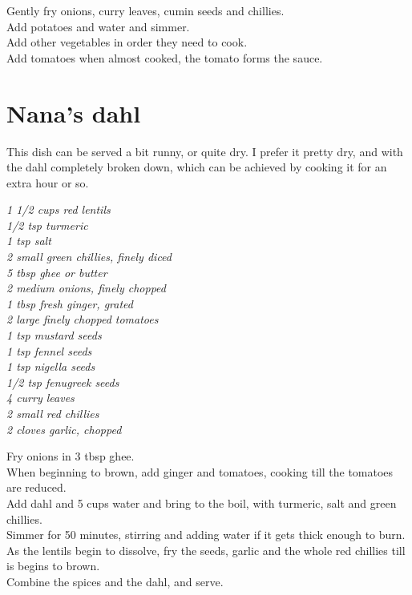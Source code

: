 \documentclass{tufte-book}
\begin{document}
\smallskip
Gently fry onions, curry leaves, cumin seeds and chillies.
\\Add potatoes and water and simmer.
\\Add other vegetables in order they need to cook.
\\Add tomatoes when almost cooked, the tomato forms the sauce.


\section{Nana's dahl}

This dish can be served a bit runny, or quite dry. I prefer it pretty dry, and with the dahl completely broken down, which can be achieved by cooking it for an extra hour or so.

\smallskip
\emph{1 1/2 cups red lentils
\\1/2 tsp turmeric
\\1 tsp salt
\\2 small green chillies, finely diced
\\5 tbsp ghee or butter
\\2 medium onions, finely chopped
\\1 tbsp fresh ginger, grated
\\2 large finely chopped tomatoes
\\1 tsp mustard seeds
\\1 tsp fennel seeds
\\1 tsp nigella seeds
\\1/2 tsp fenugreek seeds
\\4 curry leaves
\\2 small red chillies
\\2 cloves garlic, chopped}

\smallskip
Fry onions in 3 tbsp ghee. 
\\When beginning to brown, add ginger and tomatoes, cooking till the tomatoes are reduced.
\\Add dahl and 5 cups water and bring to the boil, with turmeric, salt and green chillies.
\\Simmer for 50 minutes, stirring and adding water if it gets thick enough to burn.
\\As the lentils begin to dissolve, fry the seeds, garlic and the whole red chillies till is begins to brown. 
\\Combine the spices and the dahl, and serve.
\end{document}
